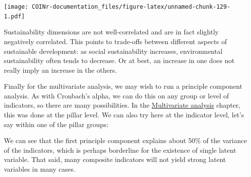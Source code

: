 \documentclass[
]{book}
\newenvironment{Shaded}{\begin{snugshade}}{\end{snugshade}}
\newcommand{\AttributeTok}[1]{\textcolor[rgb]{0.77,0.63,0.00}{#1}}
\newcommand{\DecValTok}[1]{\textcolor[rgb]{0.00,0.00,0.81}{#1}}
\newcommand{\DocumentationTok}[1]{\textcolor[rgb]{0.56,0.35,0.01}{\textbf{\textit{#1}}}}
\newcommand{\FunctionTok}[1]{\textcolor[rgb]{0.00,0.00,0.00}{#1}}
\newcommand{\NormalTok}[1]{#1}
\newcommand{\OtherTok}[1]{\textcolor[rgb]{0.56,0.35,0.01}{#1}}
\newcommand{\SpecialCharTok}[1]{\textcolor[rgb]{0.00,0.00,0.00}{#1}}
\newcommand{\StringTok}[1]{\textcolor[rgb]{0.31,0.60,0.02}{#1}}
\begin{document}
\texttt{[image: COINr-documentation\_files/figure-latex/unnamed-chunk-129-1.pdf]}

Sustainability dimensions are not well-correlated and are in fact slightly negatively correlated. This points to trade-offs between different aspects of sustainable development: as social sustainability increases, environmental sustainability often tends to decrease. Or at best, an increase in one does not really imply an increase in the others.

Finally for the multivariate analysis, we may wish to run a principle component analysis. As with Cronbach's alpha, we can do this on any group or level of indicators, so there are many possibilities. In the \protect\hyperlink{multivariate-analysis-1}{Multivariate analysis} chapter, this was done at the pillar level. We can also try here at the indicator level, let's say within one of the pillar groups:

\begin{Shaded}
\end{Shaded}

We can see that the first principle component explains about 50\% of the variance of the indicators, which is perhaps borderline for the existence of single latent variable. That said, many composite indicators will not yield strong latent variables in many cases.
\end{document}
